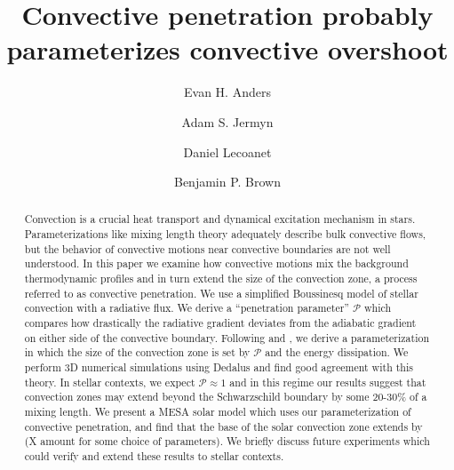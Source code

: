 \documentclass{aastex631}
\newcommand{\mP}{\ensuremath{\mathcal{P}}}
\begin{document}
\title{Convective penetration probably parameterizes convective overshoot}
\author[0000-0002-3433-4733]{Evan H. Anders}
\author[0000-0001-5048-9973]{Adam S. Jermyn}
\author[0000-0002-7635-9728]{Daniel Lecoanet}
\author[0000-0001-8935-219X]{Benjamin P. Brown}


\begin{abstract}
Convection is a crucial heat transport and dynamical excitation mechanism in stars.
Parameterizations like mixing length theory adequately describe bulk convective flows, but the behavior of convective motions near convective boundaries are not well understood.
In this paper we examine how convective motions mix the background thermodynamic profiles and in turn extend the size of the convection zone, a process referred to as convective penetration.
We use a simplified Boussinesq model of stellar convection with a radiative flux.
We derive a ``penetration parameter'' $\mathcal{P}$ which compares how drastically the radiative gradient deviates from the adiabatic gradient on either side of the convective boundary.
Following \citet{roxburgh1989} and \citet{zahn1991}, we derive a parameterization in which the size of the convection zone is set by $\mP$ and the energy dissipation.
We perform 3D numerical simulations using Dedalus and find good agreement with this theory.
In stellar contexts, we expect $\mathcal{P} \approx 1$ and in this regime our results suggest that convection zones may extend beyond the Schwarzschild boundary by some 20-30\% of a mixing length.
We present a MESA solar model which uses our parameterization of convective penetration, and find that the base of the solar convection zone extends by (X amount for some choice of parameters).
We briefly discuss future experiments which could verify and extend these results to stellar contexts.
\end{abstract}
\end{document}

